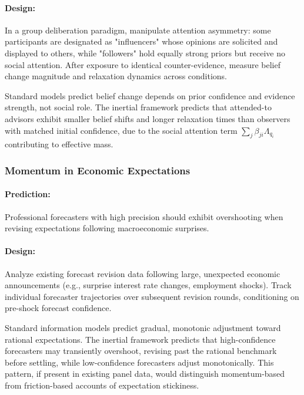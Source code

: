 \documentclass[12pt]{article}
\begin{document}
 

\paragraph{Design:} In a group deliberation paradigm, manipulate attention asymmetry: some participants are designated as "influencers" whose opinions are solicited and displayed to others, while "followers" hold equally strong priors but receive no social attention. After exposure to identical counter-evidence, measure belief change magnitude and relaxation dynamics across conditions.


Standard models predict belief change depends on prior confidence and evidence strength, not social role. The inertial framework predicts that attended-to advisors exhibit smaller belief shifts and longer relaxation times than observers with matched initial confidence, due to the social attention term $\sum_j \beta_{ji} \Lambda_{q_i}$ contributing to effective mass.
 
\subsubsection{Momentum in Economic Expectations}


\paragraph{Prediction:} Professional forecasters with high precision should exhibit overshooting when revising expectations following macroeconomic surprises.


\paragraph{Design:} Analyze existing forecast revision data \citep{coibion2015} following large, unexpected economic announcements (e.g., surprise interest rate changes, employment shocks). Track individual forecaster trajectories over subsequent revision rounds, conditioning on pre-shock forecast confidence.

Standard information models predict gradual, monotonic adjustment toward rational expectations. The inertial framework predicts that high-confidence forecasters may transiently overshoot, revising past the rational benchmark before settling, while low-confidence forecasters adjust monotonically. This pattern, if present in existing panel data, would distinguish momentum-based from friction-based accounts of expectation stickiness.
\end{document}
